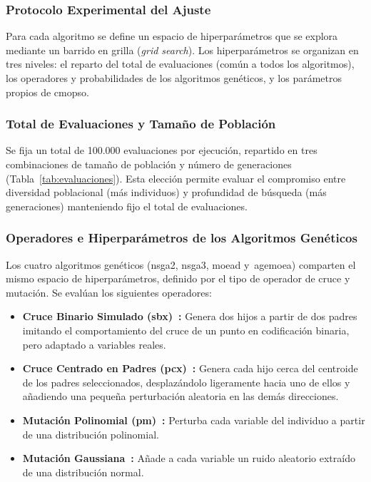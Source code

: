 \subsubsection{Protocolo Experimental del Ajuste}
\label{subsec:protocolo_ajuste}

Para cada algoritmo se define un espacio de hiperparámetros que se explora mediante un barrido en grilla (\textit{grid search}). Los hiperparámetros se organizan en tres niveles: el reparto del total de evaluaciones (común a todos los algoritmos), los operadores y probabilidades de los algoritmos genéticos, y los parámetros propios de \acrshort{cmopso}.

\subsubsection*{Total de Evaluaciones y Tamaño de Población}
Se fija un total de 100.000 evaluaciones por ejecución, repartido en tres combinaciones de tamaño de población y número de generaciones (Tabla~\ref{tab:evaluaciones}). Esta elección permite evaluar el compromiso entre diversidad poblacional (más individuos) y profundidad de búsqueda (más generaciones) manteniendo fijo el total de evaluaciones.



\subsubsection{Operadores e Hiperparámetros de los Algoritmos Genéticos}
\label{subsubsec:hp_ga}

Los cuatro algoritmos genéticos (\acrshort{nsga2}, \acrshort{nsga3}, \acrshort{moead} y~\acrshort{agemoea}) comparten el mismo espacio de hiperparámetros, definido por el tipo de operador de cruce y mutación. Se evalúan los siguientes operadores:

\begin{itemize}
    \item \textbf{Cruce Binario Simulado (\acrshort{sbx})~\cite{deb1995sbx}:} Genera dos hijos a partir de dos padres imitando el comportamiento del cruce de un punto en codificación binaria, pero adaptado a variables reales.
    \item \textbf{Cruce Centrado en Padres (\acrshort{pcx})~\cite{deb2002pcx}:} Genera cada hijo cerca del centroide de los padres seleccionados, desplazándolo ligeramente hacia uno de ellos y añadiendo una pequeña perturbación aleatoria en las demás direcciones.
    \item \textbf{Mutación Polinomial (\acrshort{pm})~\cite{deb1996polynomial}:} Perturba cada variable del individuo a partir de una distribución polinomial.
    \item \textbf{Mutación Gaussiana~\cite{back1993gaussian}:} Añade a cada variable un ruido aleatorio extraído de una distribución normal.
\end{itemize}

